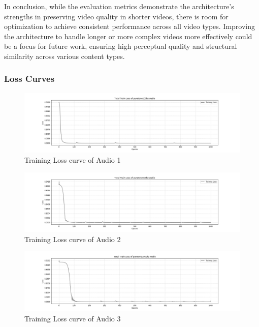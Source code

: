 \documentclass{ioereport}
\begin{document}
In conclusion, while the evaluation metrics demonstrate the architecture's strengths in preserving video quality in shorter videos, there is room for optimization to achieve consistent performance across all video types. Improving the architecture to handle longer or more complex videos more effectively could be a focus for future work, ensuring high perceptual quality and structural similarity across various content types.

\subsubsection{Loss Curves}
    \begin{figure}[H]
        \centering
        \includegraphics[width=\linewidth]{assets/audio_results/loss_curve/training_loss_curve_puretone100hz.png}
        \caption{Training Loss curve of Audio 1}
        \label{fig:loss-curve-1}
    \end{figure}
    \begin{figure}[H]
        \centering
        \includegraphics[width=\linewidth]{assets/audio_results/loss_curve/training_loss_curve_puretone500hz.png}
        \caption{Training Loss curve of Audio 2}
        \label{fig:loss-curve-2}
    \end{figure}
    \begin{figure}[H]
        \centering
        \includegraphics[width=\linewidth]{assets/audio_results/loss_curve/training_loss_curve_puretone1000hz.png}
        \caption{Training Loss curve of Audio 3}
        \label{fig:loss-curve-3}
    \end{figure}
\end{document}

